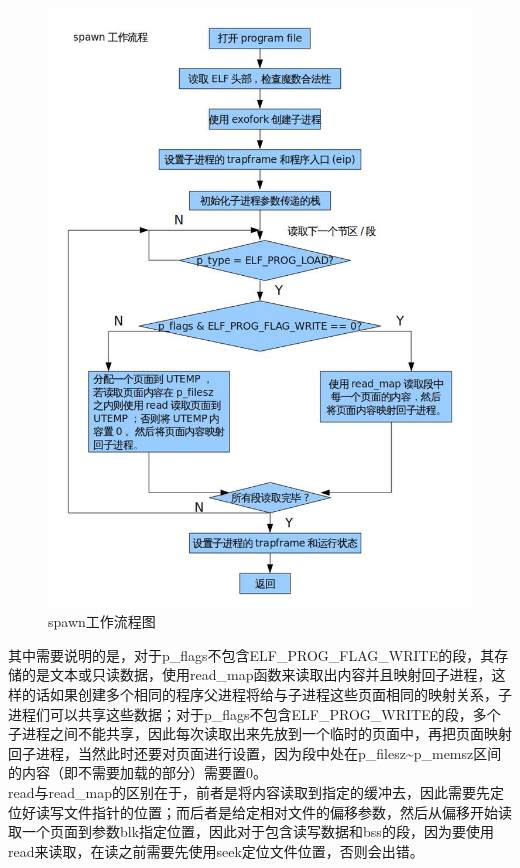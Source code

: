 \documentclass[11pt,a4paper]{article}
\begin{document}
\begin{figure}[!ht]
\begin{center}
\includegraphics[width = \textwidth]{spawn.jpg}
\end{center}
\caption{spawn工作流程图}\label{spawn}
\end{figure}

其中需要说明的是，对于p\_flags不包含ELF\_PROG\_FLAG\_WRITE的段，其存储的是文本或只读数据，使用read\_map函数来读取出内容并且映射回子进程，这样的话如果创建多个相同的程序父进程将给与子进程这些页面相同的映射关系，子进程们可以共享这些数据；对于p\_flags不包含ELF\_PROG\_WRITE的段，多个子进程之间不能共享，因此每次读取出来先放到一个临时的页面中，再把页面映射回子进程，当然此时还要对页面进行设置，因为段中处在p\_filesz\~{}p\_memsz区间的内容（即不需要加载的部分）需要置0。\\
read与read\_map的区别在于，前者是将内容读取到指定的缓冲去，因此需要先定位好读写文件指针的位置；而后者是给定相对文件的偏移参数，然后从偏移开始读取一个页面到参数blk指定位置，因此对于包含读写数据和bss的段，因为要使用read来读取，在读之前需要先使用seek定位文件位置，否则会出错。\\
\end{document}
